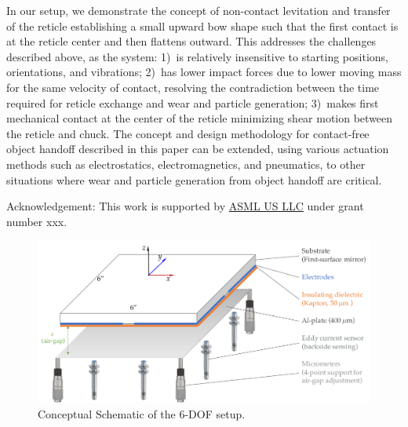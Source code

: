 \documentclass[letterpaper,10pt,onecolumn]{aspe}
\begin{document}
In our setup, we demonstrate the concept of non-contact levitation and transfer of the reticle establishing a small upward bow shape such that the first contact is at the reticle center and then flattens outward. This addresses the challenges described above, as the system: 1)~is relatively insensitive to starting positions, orientations, and vibrations;
2)~has lower impact forces due to lower moving mass for the same velocity of contact, resolving the contradiction between the time required for reticle exchange and wear and particle generation;
3)~makes first mechanical contact at the center of the reticle minimizing shear motion between the reticle and chuck.
The concept and design methodology for contact-free object handoff described in this paper can be extended, using various actuation methods such as electrostatics, electromagnetics, and pneumatics, to other situations where wear and particle generation from object handoff are critical.


\vfill
{\small Acknowledgement: This work is supported by \href{https://www.asml.com/en}{ASML US LLC} under grant number xxx.}

\newpage
\twocolumn[] %

\begin{figure}
    \centering
    \includegraphics[width=\linewidth]{ConceptSchematic.pdf}
    \caption[]{Conceptual Schematic of the 6-DOF setup.}\label{fig:ConceptSchematic}
\end{figure}
\end{document}
